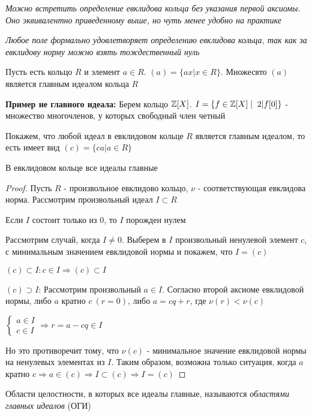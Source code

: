 \begin{normalsize}
    \notice \textit{ Можно встретить определение евклидова кольца без указания первой аксиомы. Оно эквивалентно
    приведенному выше, но чуть менее удобно на практике}

    \notice \textit{ Любое поле формально удовлетворяет определению евклидова кольца, так как за евклидову 
    норму можно взять тождественный нуль}
    
    \begin{conj}
        Пусть есть кольцо $R$ и элемент $a \in R$. $(a) = \{ax | x \in R\}$. 
        Множесвто $(a)$ является главным идеалом кольца $R$
    \end{conj}

    \textbf{Пример не главного идеала: } 
    Берем кольцо $\mathbb{Z}[X]$. $I = \{f \in \mathbb{Z}[X] \mid \; 2| f[0]\}$ -  множество многочленов, 
    у которых свободный член четный

    \qquad Покажем, что любой идеал в евклидовом кольце $R$ является главным идеалом,
    то есть имеет вид $(c) = \{ca|a \in R\}$

    \begin{theorem-non}
        В евклидовом кольце все идеалы главные
    \end{theorem-non}
    \begin{proof}
        Пусть $R$ - произвольное евклидово кольцо, $\nu$ - соответствующая евклидова норма.
        Рассмотрим произвольный идеал $I \subset R$

        Если $I$ состоит только из $0$, то $I$ порожден нулем 

        Рассмотрим случай, когда $I \neq 0$. Выберем в $I$ 
        произвольный ненулевой элемент $c$, с минимальным значением евклидовой нормы и покажем, что $I = (c)$
        
        $(c) \subset I: c \in I \Longrightarrow (c) \subset I$

        $(c) \supset I$: Рассмотрим произвольный $a \in I$. Согласно второй аксиоме евклидовой нормы,
        либо $a$ кратно $c \ (r = 0)$, либо $a = cq + r$, где $\nu(r) < \nu(c)$
        
        $\begin{cases}
            a \in I \\
            c \in I
        \end{cases} \Longrightarrow r = a - cq \in I$

        Но это противоречит тому, что $\nu(c)$ - минимальное значение евклидовой нормы 
        на ненулевых элементах из $I$. Таким образом, возможна только ситуация, когда $a$ кратно $c \Longrightarrow a \in (c) 
        \Longrightarrow I \subset (c) \Longrightarrow I = (c)$ 
    \end{proof}
    \begin{conj}
        Области целостности, в которых все идеалы главные, называются \textit{областями главных идеалов} (ОГИ)       
    \end{conj}
\end{normalsize}